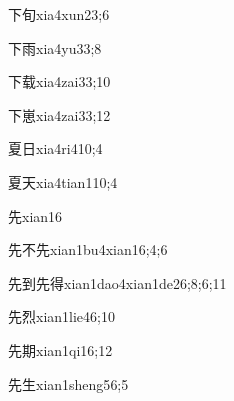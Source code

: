 \begin{verbete}{下旬}{xia4xun2}{3;6}
\end{verbete}

\begin{verbete}{下雨}{xia4yu3}{3;8}
\end{verbete}

\begin{verbete}{下载}{xia4zai3}{3;10}
\end{verbete}

\begin{verbete}{下崽}{xia4zai3}{3;12}
\end{verbete}

\begin{verbete}{夏日}{xia4ri4}{10;4}
\end{verbete}

\begin{verbete}{夏天}{xia4tian1}{10;4}
\end{verbete}

\begin{verbete}{先}{xian1}{6}
\end{verbete}

\begin{verbete}{先不先}{xian1bu4xian1}{6;4;6}
\end{verbete}

\begin{verbete}{先到先得}{xian1dao4xian1de2}{6;8;6;11}
\end{verbete}

\begin{verbete}{先烈}{xian1lie4}{6;10}
\end{verbete}

\begin{verbete}{先期}{xian1qi1}{6;12}
\end{verbete}

\begin{verbete}{先生}{xian1sheng5}{6;5}
\end{verbete}

